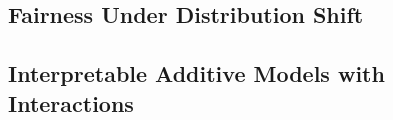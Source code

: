 \subsection{Fairness Under Distribution Shift}
\label{sec:lr-fairness-shift}


\subsection{Interpretable Additive Models with Interactions}
\label{sec:lr-additive-interactions}


